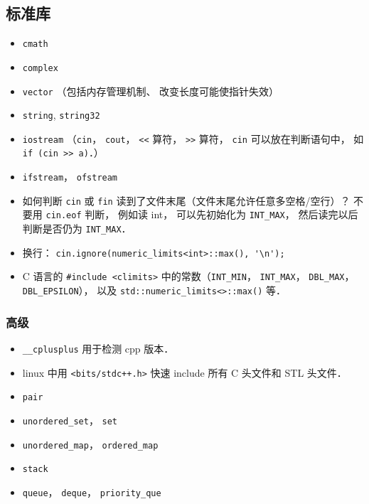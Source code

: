 \subsection{标准库}
\begin{itemize}
\item \verb|cmath|
\item \verb|complex|
\item \verb|vector| （包括内存管理机制、 改变长度可能使指针失效）
\item \verb|string|, \verb|string32|
\item \verb|iostream| （\verb|cin|， \verb|cout|， \verb|<<| 算符， \verb|>>| 算符， \verb|cin| 可以放在判断语句中， 如 \verb|if (cin >> a)|．）
\item \verb|ifstream|， \verb|ofstream|
\item 如何判断 \verb|cin| 或 \verb|fin| 读到了文件末尾（文件末尾允许任意多空格/空行）？ 不要用 \verb|cin.eof| 判断， 例如读 int， 可以先初始化为 \verb|INT_MAX|， 然后读完以后判断是否仍为 \verb|INT_MAX|．
\item 换行： \verb|cin.ignore(numeric_limits<int>::max(), '\n');|
\item C 语言的 \verb|#include <climits>| 中的常数（\verb|INT_MIN|， \verb|INT_MAX|， \verb|DBL_MAX|， \verb|DBL_EPSILON|）， 以及 \verb|std::numeric_limits<>::max()| 等．
\end{itemize}

\subsubsection{高级}
\begin{itemize}
\item \verb|__cplusplus| 用于检测 cpp 版本．
\item linux 中用 \verb|<bits/stdc++.h>| 快速 include 所有 C 头文件和 STL 头文件．
\item \verb|pair|
\item \verb|unordered_set|， \verb|set|
\item \verb|unordered_map|， \verb|ordered_map|
\item \verb|stack|
\item \verb|queue|， \verb|deque|， \verb|priority_que|
\end{itemize}

